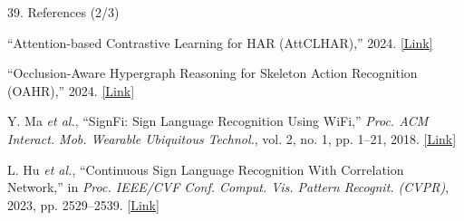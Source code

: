 \documentclass[aspectratio=169,11pt,xcolor=table]{beamer}
\begin{document}
\begin{frame}{39. References (2/3)}

\footnotesize
\color{black}
\raggedright

\begin{list}
    {}
    {
        \setlength{\leftmargin}{0.45cm}
        \setlength{\labelwidth}{0cm}
        \setlength{\labelsep}{0.10cm}
        \setlength{\itemsep}{8pt}
        \setlength{\parsep}{0pt}
        \setlength{\topsep}{0pt}
    }

\item[\textbf{[5]}]
``Attention-based Contrastive Learning for HAR (AttCLHAR),''
2024.
\hspace{2pt}
\href{https://pmc.ncbi.nlm.nih.gov/articles/PMC10857438/}
{\textcolor{AmritaMaroon}{[Link]}}

\item[\textbf{[6]}]
``Occlusion-Aware Hypergraph Reasoning for Skeleton Action Recognition
(OAHR),'' 2024.
\hspace{2pt}
\href{https://www.researchgate.net/publication/363910427_Revisiting_Skeleton-based_Action_Recognition}
{\textcolor{AmritaMaroon}{[Link]}}

\item[\textbf{[7]}]
Y. Ma \emph{et al.}, ``SignFi: Sign Language Recognition Using WiFi,''
\emph{Proc. ACM Interact. Mob. Wearable Ubiquitous Technol.},
vol. 2, no. 1, pp. 1--21, 2018.
\hspace{2pt}
\href{https://dl.acm.org/doi/10.1145/3191755}
{\textcolor{AmritaMaroon}{[Link]}}

\item[\textbf{[8]}]
L. Hu \emph{et al.}, ``Continuous Sign Language Recognition With
Correlation Network,'' in \emph{Proc. IEEE/CVF Conf. Comput. Vis.
Pattern Recognit. (CVPR)}, 2023, pp. 2529--2539.
\hspace{2pt}
\href{https://openaccess.thecvf.com/content/CVPR2023/html/Hu_Continuous_Sign_Language_Recognition_With_Correlation_Network_CVPR_2023_paper.html}
{\textcolor{AmritaMaroon}{[Link]}}

\end{list}

\end{frame}


\end{document}
